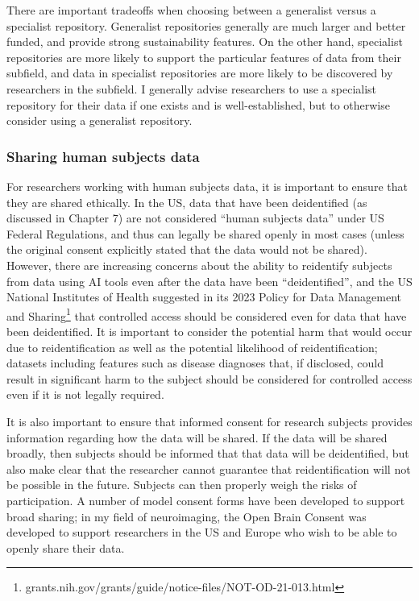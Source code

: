 There are important tradeoffs when choosing between a generalist versus a specialist repository. Generalist repositories generally are much larger and better funded, and provide strong sustainability features. On the other hand, specialist repositories are more likely to support the particular features of data from their subfield, and data in specialist repositories are more likely to be discovered by researchers in the subfield.  I generally advise researchers to use a specialist repository for their data if one exists and is well-established, but to otherwise consider using a generalist repository.

\subsubsection{Sharing human subjects data}

For researchers working with human subjects data, it is important to ensure that they are shared ethically.  In the US, data that have been deidentified (as discussed in Chapter 7) are not considered ``human subjects data'' under US Federal Regulations, and thus can legally be shared openly in most cases (unless the original consent explicitly stated that the data would not be shared).  However, there are increasing concerns about the ability to reidentify subjects from data using AI tools even after the data have been ``deidentified'', and the US National Institutes of Health suggested in its 2023 Policy for Data Management and Sharing\footnote{grants.nih.gov/grants/guide/notice-files/NOT-OD-21-013.html} that controlled access should be considered even for data that have been deidentified.  It is important to consider the potential harm that would occur due to reidentification as well as the potential likelihood of reidentification; datasets including features such as disease diagnoses that, if disclosed, could result in significant harm to the subject should be considered for controlled access even if it is not legally required.

It is also important to ensure that informed consent for research subjects provides information regarding how the data will be shared.  If the data will be shared broadly, then subjects should be informed that that data will be deidentified, but also make clear that the researcher cannot guarantee that reidentification will not be possible in the future.  Subjects can then properly weigh the risks of participation.  A number of model consent forms have been developed to support broad sharing; in my field of neuroimaging, the Open Brain Consent \citep{Bannier:2021aa} was developed to support researchers in the US and Europe who wish to be able to openly share their data.

